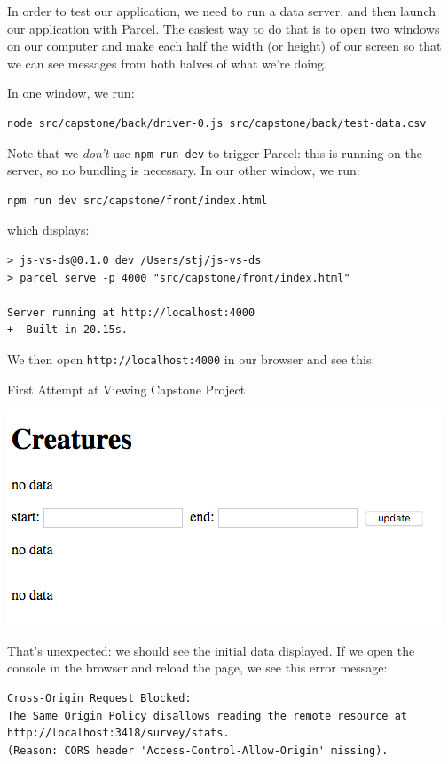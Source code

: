 In order to test our application, we need to run a data server, and then
launch our application with Parcel. The easiest way to do that is to
open two windows on our computer and make each half the width (or
height) of our screen so that we can see messages from both halves of
what we're doing.

In one window, we run:

\begin{verbatim}
node src/capstone/back/driver-0.js src/capstone/back/test-data.csv
\end{verbatim}

Note that we \emph{don't} use \texttt{npm\ run\ dev} to trigger Parcel:
this is running on the server, so no bundling is necessary. In our other
window, we run:

\begin{verbatim}
npm run dev src/capstone/front/index.html
\end{verbatim}

which displays:

\begin{verbatim}
> js-vs-ds@0.1.0 dev /Users/stj/js-vs-ds
> parcel serve -p 4000 "src/capstone/front/index.html"

Server running at http://localhost:4000
+  Built in 20.15s.
\end{verbatim}

We then open \texttt{http://localhost:4000} in our browser and see this:

First Attempt at Viewing Capstone Project

\includegraphics{../../files/capstone-first-attempt.png}

That's unexpected: we should see the initial data displayed. If we open
the console in the browser and reload the page, we see this error
message:

\begin{verbatim}
Cross-Origin Request Blocked:
The Same Origin Policy disallows reading the remote resource at http://localhost:3418/survey/stats.
(Reason: CORS header 'Access-Control-Allow-Origin' missing).
\end{verbatim}


